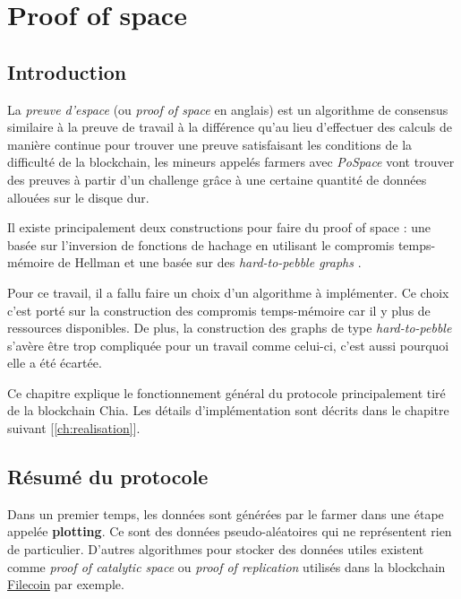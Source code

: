 \chapter{Proof of space}
\label{ch:pospace}

\section{Introduction}

La \emph{preuve d'espace} (ou \emph{proof of space} en anglais) est un algorithme de consensus similaire à la preuve de travail à la différence qu'au lieu d'effectuer des calculs de manière continue pour trouver une preuve satisfaisant les conditions de la difficulté de la blockchain, les mineurs appelés farmers avec \emph{PoSpace} vont trouver des preuves à partir d'un challenge grâce à une certaine quantité de données allouées sur le disque dur. 

Il existe principalement deux constructions pour faire du proof of space : une basée sur l'inversion de fonctions de hachage en utilisant le compromis temps-mémoire de Hellman \cite{DBLP:conf/asiacrypt/AbusalahACKPR17} et une basée sur des \emph{hard-to-pebble graphs} \cite{DBLP:conf/crypto/DziembowskiFKP15}.

Pour ce travail, il a fallu faire un choix d'un algorithme à implémenter. Ce choix c'est porté sur la construction des compromis temps-mémoire car il y plus de ressources disponibles. De plus, la construction des graphs de type \emph{hard-to-pebble} s'avère être trop compliquée pour un travail comme celui-ci, c'est aussi pourquoi elle a été écartée.

Ce chapitre explique le fonctionnement général du protocole principalement tiré de la blockchain Chia. Les détails d'implémentation sont décrits dans le chapitre suivant [\ref{ch:realisation}].

\section{Résumé du protocole}

Dans un premier temps, les données sont générées par le farmer dans une étape appelée \textbf{plotting}. Ce sont des données pseudo-aléatoires qui ne représentent rien de particulier. D'autres algorithmes pour stocker des données utiles existent comme \emph{proof of catalytic space} ou \emph{proof of replication} utilisés dans la blockchain \href{https://filecoin.io/}{Filecoin} par exemple.

